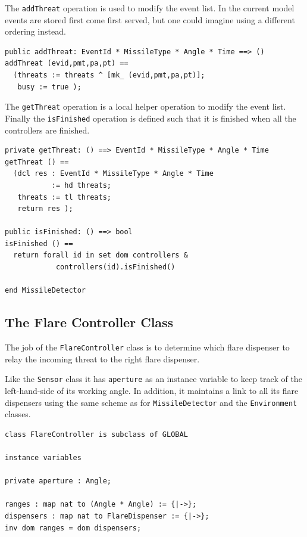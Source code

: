 \documentclass{overturerepchap}
\begin{document}
The \texttt{addThreat} operation is used to modify the event
list. In the current model events are stored first come first served,
but one could imagine using a different ordering instead.

\begin{lstlisting}
public addThreat: EventId * MissileType * Angle * Time ==> ()
addThreat (evid,pmt,pa,pt) == 
  (threats := threats ^ [mk_ (evid,pmt,pa,pt)];
   busy := true );
\end{lstlisting}

The \texttt{getThreat} operation is a local helper operation to modify the event list.
Finally the \texttt{isFinished} operation is defined such that it is finished when
all the controllers are finished.

\begin{lstlisting}
private getThreat: () ==> EventId * MissileType * Angle * Time
getThreat () ==
  (dcl res : EventId * MissileType * Angle * Time 
           := hd threats;
   threats := tl threats;
   return res );

public isFinished: () ==> bool
isFinished () ==
  return forall id in set dom controllers &
            controllers(id).isFinished()

end MissileDetector
\end{lstlisting}

\subsection{The Flare Controller Class}

The job of the \texttt{FlareController} class is to determine which flare
dispenser to relay the incoming threat to the right flare dispenser.

Like the \texttt{Sensor} class it has \texttt{aperture} as an instance 
variable to keep track of the left-hand-side of its working angle. 
In addition, it maintains a link to all its flare dispensers using the 
same scheme as for \texttt{MissileDetector} and the \texttt{Environment}
classes.

\begin{lstlisting}
class FlareController is subclass of GLOBAL

instance variables

private aperture : Angle;

ranges : map nat to (Angle * Angle) := {|->};
dispensers : map nat to FlareDispenser := {|->};
inv dom ranges = dom dispensers;
\end{lstlisting}
\end{document}
